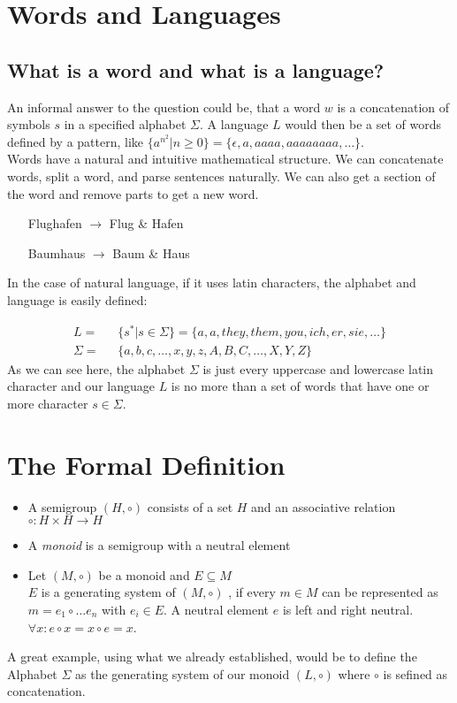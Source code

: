 \documentclass[a4paper, 11pt]{article}
\begin{document}
    \section{Words and Languages}
    \subsection{What is a word and what is a language?}
    An informal answer to the question could be, that a word $w$ is a concatenation of symbols $s$ in a specified alphabet $\Sigma$.
    A language $L$ would then be a set of words defined by a pattern, like $\{a^{n^{2}}|n \geq 0 \} = \{\epsilon, a, aaaa, aaaaaaaa, \dots\}$.
    \\
    Words have a natural and intuitive mathematical structure. We can concatenate words, split a word, and parse sentences naturally. 
    We can also get a section of the word and remove parts to get a new word.
    \begin{itemize}
      \centering
      \item[Flughafen $\rightarrow$] Flug \& Hafen
      \item[Baumhaus $\rightarrow$] Baum \& Haus  
    \end{itemize}
    In the case of natural language, if it uses latin characters, the alphabet and language is easily defined:

    \begin{align}
            L = & \mbox{ } \{s^* | s\in \Sigma\} = \{a, a, they, them, you, ich, er, sie, \dots\}\\
       \Sigma = &\mbox{ }  \{a,b,c,\dots,x,y,z,A,B,C,\dots,X,Y,Z\}
    \end{align}
    As we can see here, the alphabet $\Sigma$ is just every uppercase and lowercase latin character and our language $L$ is
    no more than a set of words that have one or more character $s\in\Sigma$.

    \section{The Formal Definition}
    \begin{itemize}
      \item A semigroup $(H, \circ)$ consists of a set $H$ and an associative relation $\circ:H\times H \rightarrow H$
      \item A \emph{monoid} is a semigroup with a neutral element
      \item Let $(M, \circ)$ be a monoid and $E \subseteq M$\\
            $E$ is a generating system of $(M, \circ)$ , if every $m\in M$ can be represented as $m=e_1\circ\dots e_n$ with $e_i \in E$.
            A neutral element $e$ is left and right neutral. $\forall x : e\circ x = x\circ e = x$.
    \end{itemize}
    A great example, using what we already established, would be to define the Alphabet $\Sigma$ as the generating system of our monoid 
    $(L, \circ)$ where $\circ$ is sefined as concatenation.
\end{document}
